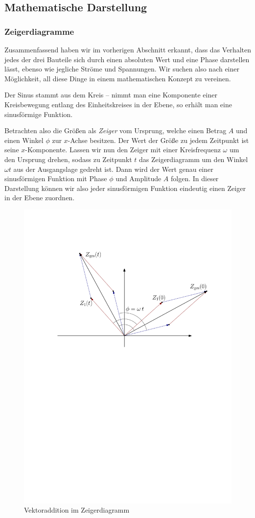 \subsection{Mathematische Darstellung}
\subsubsection{Zeigerdiagramme}
Zusammenfassend haben wir im vorherigen Abschnitt erkannt, dass das Verhalten jedes der drei Bauteile sich durch einen
absoluten Wert und eine Phase darstellen lässt, ebenso wie jegliche Ströme und Spannungen. Wir suchen also nach einer
Möglichkeit, all diese Dinge in einem mathematischen Konzept zu vereinen.

Der Sinus stammt aus dem Kreis -- nimmt man eine Komponente einer Kreisbewegung entlang des Einheitskreises in der
Ebene, so erhält man eine sinusförmige Funktion.

Betrachten also die Größen als \emph{Zeiger} vom Ursprung, welche einen Betrag $A$ und einen Winkel $\phi$ zur $x$-Achse
besitzen.  Der Wert der Größe zu jedem Zeitpunkt ist seine $x$-Komponente. Lassen wir nun den Zeiger mit einer
Kreisfrequenz $\omega$ um den Ursprung drehen, sodass zu Zeitpunkt $t$ das Zeigerdiagramm um den Winkel $\omega t$ aus
der Ausgangslage gedreht ist. Dann wird der Wert genau einer sinusförmigen Funktion mit Phase $\phi$
und Amplitude $A$ folgen. In dieser Darstellung können wir also jeder sinusförmigen Funktion eindeutig einen Zeiger in
der Ebene zuordnen.

\begin{figure}[h]
    \centering
    \includegraphics[width=.7\textwidth]{kZeiger.pdf}
    \caption{Vektoraddition im Zeigerdiagramm}
\end{figure}

